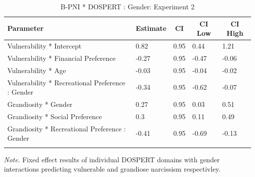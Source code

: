 \documentclass[
  donotrepeattitle,doc, 12pt, a4paper,floatsintext]{apa7}
\begin{document}
\begin{table}[ht]

\begin{center}
\begin{threeparttable}

\caption{\label{tab:vulnerabiliotyGrandiosityAndGenderExperiment2}B-PNI * DOSPERT : Gender: Experiment 2}

\begin{tabular}{lllll}
\toprule
Parameter & \multicolumn{1}{c}{Estimate} & \multicolumn{1}{c}{CI} & \multicolumn{1}{c}{CI Low} & \multicolumn{1}{c}{CI High}\\
\midrule
Vulnerability * Intercept & 0.82 & 0.95 & 0.44 & 1.21\\
Vulnerability * Financial Preference & -0.27 & 0.95 & -0.47 & -0.06\\
Vulnerability * Age & -0.03 & 0.95 & -0.04 & -0.02\\
Vulnerability * Recreational Preference : Gender & -0.34 & 0.95 & -0.62 & -0.07\\
Grandiosity * Gender & 0.27 & 0.95 & 0.03 & 0.51\\
Grandiosity * Social Preference & 0.3 & 0.95 & 0.11 & 0.49\\
Grandiosity * Recreational Preference : Gender & -0.41 & 0.95 & -0.69 & -0.13\\
\bottomrule
\addlinespace
\end{tabular}

\begin{tablenotes}[para]
\normalsize{\textit{Note.} Fixed effect results of individual DOSPERT domains with gender interactions predicting vulnerable and grandiose narcissism respectivley.}
\end{tablenotes}

\end{threeparttable}
\end{center}

\end{table}
\end{document}
